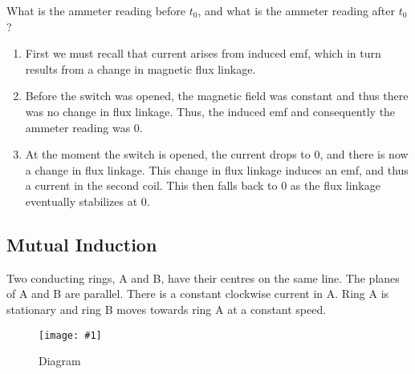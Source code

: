 \documentclass[a4paper,12pt]{article}
\newcommand{\img}[4]{\begin{center}
  \begin{figure}[H]
    \centering
    \texttt{[image: \#1]}
    \caption{#3}
    \label{fig:#4}
  \end{figure}
\end{center}}
\begin{document}
What is the ammeter reading before $t_0$, and what is the ammeter reading after $t_0$?
\begin{enumerate}
  \item First we must recall that current arises from induced emf, which in turn results from a change in magnetic flux linkage.
  \item Before the switch was opened, the magnetic field was constant and thus there was no change in flux linkage. Thus, the induced emf and consequently the ammeter reading was 0.
  \item At the moment the switch is opened, the current drops to 0, and there is now a change in flux linkage. This change in flux linkage induces an emf, and thus a current in the second coil. This then falls back to 0 as the flux linkage eventually stabilizes at 0.
\end{enumerate}

\pagebreak

\subsection{Mutual Induction}

Two conducting rings, A and B, have their centres on the same line. The planes of A and B
are parallel. There is a constant clockwise current in A. Ring A is stationary and ring B moves
towards ring A at a constant speed.

\img{ex/mutual.png}{0.45}{Diagram}{mutual}
\end{document}
